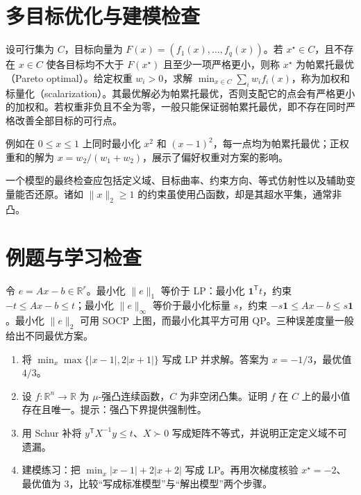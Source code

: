 \section{多目标优化与建模检查}

设可行集为 $C$，目标向量为 $F(x)=(f_1(x),\ldots,f_q(x))$。若 $x^\star\in C$，且不存在 $x\in C$ 使各目标均不大于 $F(x^\star)$ 且至少一项严格更小，则称 $x^\star$ 为帕累托最优（Pareto optimal）。给定权重 $w_i>0$，求解 $\min_{x\in C}\sum_iw_i f_i(x)$，称为加权和标量化（scalarization）。其最优解必为帕累托最优，否则支配它的点会有严格更小的加权和。若权重非负且不全为零，一般只能保证弱帕累托最优，即不存在同时严格改善全部目标的可行点。

例如在 $0\leq x\leq1$ 上同时最小化 $x^2$ 和 $(x-1)^2$，每一点均为帕累托最优；正权重和的解为 $x=w_2/(w_1+w_2)$，展示了偏好权重对方案的影响。

一个模型的最终检查应包括定义域、目标曲率、约束方向、等式仿射性以及辅助变量能否还原。诸如 $\|x\|_2\geq1$ 的约束虽使用凸函数，却是其超水平集，通常非凸。

\section{例题与学习检查}
\begin{example}[同一残差的不同模型]
令 $e=Ax-b\in\mathbb R^r$。最小化 $\|e\|_1$ 等价于 LP：最小化 $\mathbf1^{\mathsf T}t$，约束 $-t\leq Ax-b\leq t$；最小化 $\|e\|_\infty$ 等价于最小化标量 $s$，约束 $-s\mathbf1\leq Ax-b\leq s\mathbf1$。最小化 $\|e\|_2$ 可用 SOCP 上图，而最小化其平方可用 QP。三种误差度量一般给出不同最优方案。
\end{example}
\begin{enumerate}
 \item 将 $\min_x\max\{|x-1|,2|x+1|\}$ 写成 LP 并求解。答案为 $x=-1/3$，最优值 $4/3$。
 \item 设 $f:\mathbb R^n\to\mathbb R$ 为 $\mu$-强凸连续函数，$C$ 为非空闭凸集。证明 $f$ 在 $C$ 上的最小值存在且唯一。提示：强凸下界提供强制性。
 \item 用 Schur 补将 $y^{\mathsf T}X^{-1}y\leq t$、$X\succ0$ 写成矩阵不等式，并说明正定定义域不可遗漏。
 \item 建模练习：把 $\min_x |x-1|+2|x+2|$ 写成 LP。再用次梯度核验 $x^\star=-2$、最优值为 $3$，比较“写成标准模型”与“解出模型”两个步骤。
\end{enumerate}

